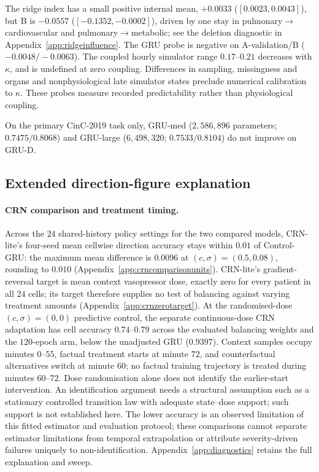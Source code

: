 The ridge index has a small positive internal mean, $+0.0033$ ($[0.0023,\allowbreak 0.0043]$), but B is $-0.0557$ ($[-0.1352,\allowbreak -0.0002]$), driven by one stay in pulmonary$\rightarrow$\allowbreak{}cardiovascular and pulmonary$\rightarrow$\allowbreak{}metabolic; see the deletion diagnostic in Appendix~\ref{app:ridgeinfluence}. The GRU probe is negative on A-validation/B ($-0.0048/-0.0063$). The coupled hourly simulator range $0.17$--$0.21$ decreases with $\kappa$, and is undefined at zero coupling. Differences in sampling, missingness and organs and nonphysiological late simulator states preclude numerical calibration to $\kappa$. These probes measure recorded predictability rather than physiological coupling.


On the primary CinC-2019 task only, GRU-med ($2{,}586{,}896$ parameters; $0.7475/0.8068$) and GRU-large ($6{,}498{,}320$; $0.7533/0.8104$) do not improve on GRU-D.


\subsection{Extended direction-figure explanation}
\paragraph{CRN comparison and treatment timing.}\label{app:crnmaincomparison}
Across the $24$ shared-history policy settings for the two compared models, CRN-lite's four-seed mean cellwise direction accuracy stays within $0.01$ of Control-GRU: the maximum mean difference is $0.0096$ at $(c,\sigma)=(0.5,0.08)$, rounding to $0.010$ (Appendix~\ref{app:crncomparisonunits}). CRN-lite's gradient-reversal target is mean context vasopressor dose, exactly zero for every patient in all $24$ cells; its target therefore supplies no test of balancing against varying treatment amounts (Appendix~\ref{app:crnzerotarget}). At the randomised-dose $(c,\sigma)=(0,0)$ predictive control, the separate continuous-dose CRN adaptation has cell accuracy $0.74$--$0.79$ across the evaluated balancing weights and the $120$-epoch arm, below the unadjusted GRU ($0.9397$). Context samples occupy minutes $0$--$55$, factual treatment starts at minute $72$, and counterfactual alternatives switch at minute $60$; no factual training trajectory is treated during minutes $60$--$72$. Dose randomisation alone does not identify the earlier-start intervention. An identification argument needs a structural assumption such as a stationary controlled transition law with adequate state--dose support; such support is not established here. The lower accuracy is an observed limitation of this fitted estimator and evaluation protocol; these comparisons cannot separate estimator limitations from temporal extrapolation or attribute severity-driven failures uniquely to non-identification. Appendix~\ref{app:diagnostics} retains the full explanation and sweep.



